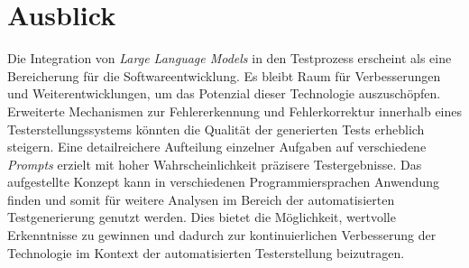 \section{Ausblick}
Die Integration von \textit{Large Language Models} in den Testprozess erscheint als eine Bereicherung für die Softwareentwicklung. Es bleibt Raum für Verbesserungen und Weiterentwicklungen, um das Potenzial dieser Technologie auszuschöpfen. Erweiterte Mechanismen zur Fehlererkennung und Fehlerkorrektur innerhalb eines Testerstellungssystems könnten die Qualität der generierten Tests erheblich steigern. Eine detailreichere Aufteilung einzelner Aufgaben auf verschiedene \textit{Prompts} erzielt mit hoher Wahrscheinlichkeit präzisere Testergebnisse. Das aufgestellte Konzept kann in verschiedenen Programmiersprachen Anwendung finden und somit für weitere Analysen im Bereich der automatisierten Testgenerierung genutzt werden. Dies bietet die Möglichkeit, wertvolle Erkenntnisse zu gewinnen und dadurch zur kontinuierlichen Verbesserung der Technologie im Kontext der automatisierten Testerstellung beizutragen.